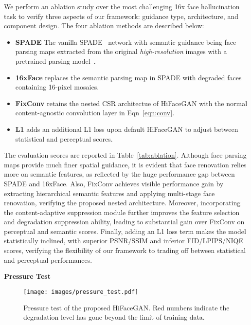 \documentclass[sigconf]{acmart}
\begin{document}
We perform an ablation study over the most challenging 16x face hallucination task to verify three aspects of our framework: guidance type, architecture, and component design. The four ablation methods are described below:
\begin{itemize}
	\item \textbf{SPADE} The vanilla SPADE~\cite{spade} network with semantic guidance being face parsing maps extracted from the original \textit{high-resolution} images with a pretrained parsing model~\cite{MaskGAN}.
	\item \textbf{16xFace} replaces the semantic parsing map in SPADE with degraded faces containing 16-pixel mosaics.
	\item \textbf{FixConv} retains the nested CSR architectue of HiFaceGAN with the normal content-agnostic convolution layer in Eqn~\eqref{eqn:conv}.
	\item \textbf{L1} adds an additional L1 loss upon default HiFaceGAN to adjust between statistical and perceptual scores.
\end{itemize}

The evaluation scores are reported in Table~\ref{tab:ablation}. Although face parsing maps provide much finer spatial guidance, it is evident that face renovation relies more on semantic features, as reflected by the huge performance gap between SPADE and 16xFace. Also, FixConv achieves visible performance gain by extracting hierarchical semantic features and applying multi-stage face renovation, verifying the proposed nested architecture. Moreover, incorporating the content-adaptive suppression module further improves the feature selection and degradation suppression ability, leading to substantial gain over FixConv on perceptual and semantic scores. Finally, adding an L1 loss term makes the model statistically inclined, with superior PSNR/SSIM and inferior FID/LPIPS/NIQE scores, verifying the flexibility of our framework to trading off between statistical and perceptual performances.

\iffalse
\textbf{Pressure Test}
\begin{figure}[!tp]
	\centering
	\texttt{[image: images/pressure\_test.pdf]}
	\caption{
		Pressure test of the proposed HiFaceGAN. Red numbers indicate the degradation level has gone beyond the limit of training data.
	}\label{fig:pressure_test}
\end{figure}
\end{document}
